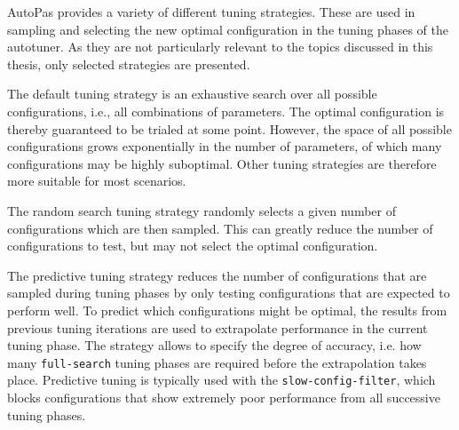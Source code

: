 AutoPas provides a variety of different tuning strategies. These are used in sampling and selecting the new optimal configuration in the tuning phases of the autotuner. As they are not particularly relevant to the topics discussed in this thesis, only selected strategies are presented.
\begin{description}[leftmargin=!,labelwidth=\widthof{\textbf{PredictiveTuning }}]
	\item[\textbf{FullSearch}] The default tuning strategy is an exhaustive search over all possible configurations, i.e., all combinations of parameters. The optimal configuration is thereby guaranteed to be trialed at some point. However, the space of all possible configurations grows exponentially in the number of parameters, of which many configurations may be highly suboptimal. Other tuning strategies are therefore more suitable for most scenarios.
	\item[\textbf{RandomSearch}] The random search tuning strategy randomly selects a given number of configurations which are then sampled. This can greatly reduce the number of configurations to test, but may not select the optimal configuration.
	\item[\textbf{PredictiveTuning}] The predictive tuning strategy reduces the number of configurations that are sampled during tuning phases by only testing configurations that are expected to perform well. To predict which configurations might be optimal, the results from previous tuning iterations are used to extrapolate performance in the current tuning phase. The strategy allows to specify the degree of accuracy, i.e. how many \texttt{full-search} tuning phases are required before the extrapolation takes place. Predictive tuning is typically used with the \texttt{slow-config-filter}, which blocks configurations that show extremely poor performance from all successive tuning phases. \cite{Pelloth2020}
\end{description}



